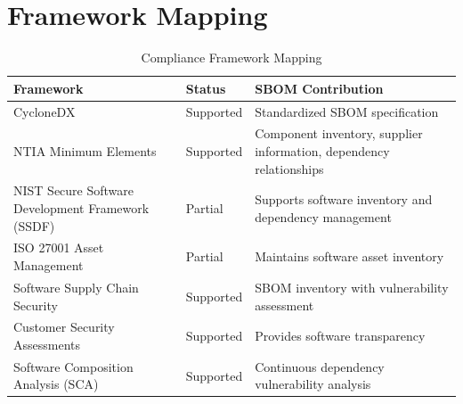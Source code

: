 \section{Framework Mapping}

\begin{table}[H]
\centering
\small
\renewcommand{\arraystretch}{1.3}

\begin{tabular}{p{5cm}p{3cm}p{5cm}}
\toprule
\rowcolor{ZWPrimary}
\textbf{\color{white}Framework} & \textbf{\color{white}Status} & \textbf{\color{white}SBOM Contribution} \\
\midrule
CycloneDX & Supported & Standardized SBOM specification \\
NTIA Minimum Elements & Supported & Component inventory, supplier information, dependency relationships \\
NIST Secure Software Development Framework (SSDF) & Partial & Supports software inventory and dependency management \\
ISO 27001 Asset Management & Partial & Maintains software asset inventory \\
Software Supply Chain Security & Supported & SBOM inventory with vulnerability assessment \\
Customer Security Assessments & Supported & Provides software transparency \\
Software Composition Analysis (SCA) & Supported & Continuous dependency vulnerability analysis \\
\bottomrule
\end{tabular}
\caption{Compliance Framework Mapping}
\end{table}

\vspace{0.4cm}



